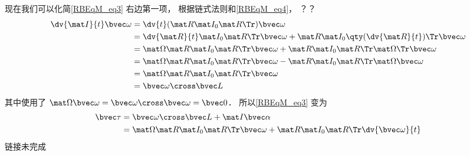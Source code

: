 现在我们可以化简\autoref{RBEqM_eq3} 右边第一项， 根据链式法则和\autoref{RBEqM_eq4}， ？？
\begin{equation}
\begin{aligned}
\dv{\mat I}{t}\bvec\omega &= \dv{t}(\mat R \mat I_0 \mat R\Tr)\bvec\omega\\
&= \dv{\mat R}{t} \mat I_0 \mat R\Tr \bvec\omega + \mat R \mat I_0 \qty(\dv{\mat R}{t})\Tr \bvec\omega\\
&= \mat \Omega \mat R \mat I_0 \mat R\Tr \bvec\omega + \mat R \mat I_0 \mat R\Tr \mat \Omega\Tr \bvec\omega\\
&= \mat \Omega \mat R \mat I_0 \mat R\Tr \bvec\omega - \mat R \mat I_0 \mat R\Tr \mat \Omega \bvec\omega\\
&= \mat \Omega \mat R \mat I_0 \mat R\Tr \bvec\omega\\
&= \bvec \omega \cross \bvec L
\end{aligned}
\end{equation}
其中使用了 $\mat \Omega \bvec\omega = \bvec\omega \cross \bvec\omega = \bvec 0$． 所以\autoref{RBEqM_eq3} 变为
\begin{equation}
\begin{aligned}
\bvec\tau &= \bvec\omega \cross \bvec L + \mat I \bvec\alpha\\
&= \mat \Omega \mat R \mat I_0 \mat R\Tr \bvec\omega + \mat R \mat I_0 \mat R\Tr \dv{\bvec\omega}{t}
\end{aligned}
\end{equation}
 链接未完成
